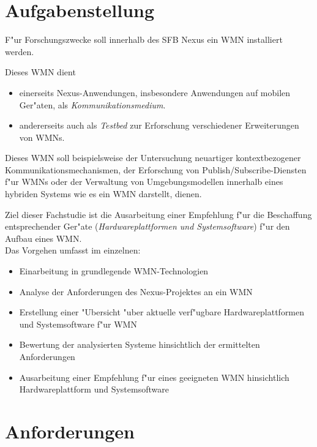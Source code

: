 \section{Aufgabenstellung}
\label{sec:Aufgabenstellung}

F"ur Forschungszwecke soll innerhalb des SFB Nexus \cite{nexus}
ein WMN installiert werden. 

Dieses WMN dient 
\begin{itemize}
	\item einerseits Nexus-Anwendungen, insbesondere Anwendungen 
	auf mobilen Ger"aten, als \emph{Kommunikationsmedium}. 

	\item andererseits auch als \emph{Testbed} 
	zur Erforschung verschiedener Erweiterungen von WMNs.
\end{itemize}

Dieses WMN soll beispielsweise der Untersuchung neuartiger kontextbezogener 
Kommunikationsmechanismen, der Erforschung von 
Publish/Subscribe-Diensten f"ur WMNs oder der 
Verwaltung von Umgebungsmodellen innerhalb eines 
hybriden Systems wie es ein WMN darstellt, dienen.

Ziel dieser Fachstudie ist die Ausarbeitung einer 
Empfehlung f"ur die Beschaffung entsprechender Ger"ate 
(\emph{Hardwareplattformen und Systemsoftware}) f"ur
den Aufbau eines WMN. \\

Das Vorgehen umfasst im einzelnen:

\begin{itemize}
	
	\item Einarbeitung in grundlegende WMN-Technologien
	\item Analyse der Anforderungen des Nexus-Projektes an ein WMN
	\item Erstellung einer "Ubersicht "uber aktuelle verf"ugbare 
	Hardwareplattformen und Systemsoftware f"ur WMN
	\item Bewertung der analysierten Systeme hinsichtlich 
	der ermittelten Anforderungen 	
	\item Ausarbeitung einer Empfehlung f"ur eines geeigneten 
	WMN hinsichtlich Hardwareplattform und Systemsoftware
	
\end{itemize}


\section{Anforderungen}


